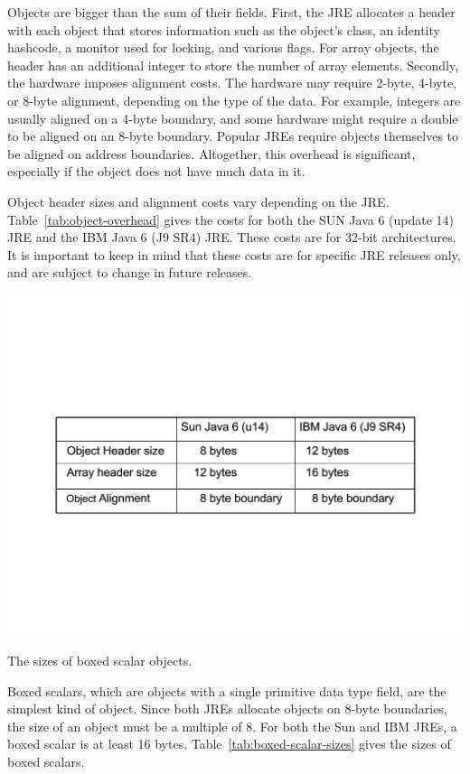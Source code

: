 Objects are bigger than the sum of their fields. First, the JRE allocates a header with each object that stores information such as the object's class, an identity hashcode, a monitor used for locking, and various flags. For array objects, the header has an additional integer to store the number of array elements. Secondly, the hardware imposes alignment costs. The hardware may require 2-byte, 4-byte, or 8-byte alignment, depending on the type of the data. For example, integers are usually aligned on a 4-byte boundary, and some hardware might require a double to be aligned on an 8-byte boundary. Popular JREs require objects themselves to be aligned on address boundaries. Altogether, this overhead is significant, especially if the object does not have much data in it.

Object header sizes and alignment costs vary depending on the JRE. Table~\ref{tab:object-overhead} gives the costs for both the SUN Java 6 (update 14) JRE and the IBM Java 6 (J9 SR4) JRE. These costs are for 32-bit architectures. It is important to keep in mind that these costs are for specific JRE releases only, and are subject to change in future releases.
\begin{table}
  \centering
 \includegraphics[width=.70\textwidth]{Figures/chapter4/object-overhead.pdf}
  \caption{The sizes of boxed scalar objects.}
  \label{tab:object-overhead}
\end{table} 
 
Boxed scalars, which are objects with a single primitive data type field, are the simplest kind of  object. Since both JREs allocate objects on 8-byte boundaries, the size of an object must be a multiple of 8. For both the Sun and IBM JREs, a boxed scalar is at least 16 bytes.  Table~\ref{tab:boxed-scalar-sizes} gives the sizes of boxed scalars.


